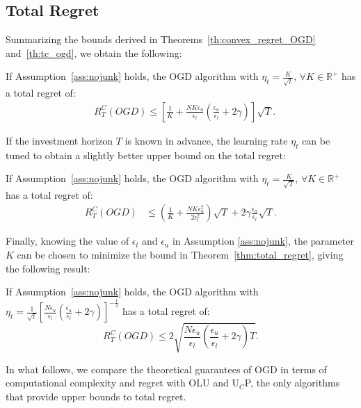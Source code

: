 \subsection{Total Regret}
Summarizing the bounds derived in Theorems~\ref{th:convex_regret_OGD} and~\ref{th:tc_ogd}, we obtain the following:
\begin{theorem} \label{thm:total_regret}
    If Assumption~\ref{ass:nojunk} holds, the OGD algorithm with $\eta_t = \frac{K}{\sqrt{t}}$,  $\forall K \in \mathbb{R}^+$ has a total regret of:
    \begin{align*}
        & R_T^C(OGD) \le \left[ \frac{1}{K} + \frac{NK\epsilon_u}{\epsilon_l}\left( \frac{\epsilon_u}{\epsilon_l} + 2 \gamma \right) \right] \sqrt{T}. %
    \end{align*}
\end{theorem}
If the investment horizon $T$ is known in advance, the learning rate $\eta_t$ can be tuned to obtain a slightly better upper bound on the total regret:
\begin{corollary}\label{cor:OGD_T_known}
   If Assumption~\ref{ass:nojunk} holds, the OGD algorithm with $\eta_t=\frac{K}{\sqrt{T}}$, $\forall K \in \mathbb{R}^+$ has a total regret of:
    \begin{align}
    R_T^C(OGD) &\leq \left( \frac{1}{K} + \frac{NK \epsilon_u^2}{2 \epsilon_l^2} \right) \sqrt{T} + 2 \gamma  \frac{\epsilon_u}{\epsilon_l} \sqrt{T}. \label{eq:OGD_T_known}
    \end{align}
\end{corollary}

Finally, knowing the value of $\epsilon_l$ and $\epsilon_u$ in Assumption \ref{ass:nojunk}, the parameter $K$ can be chosen to minimize the bound in Theorem~\ref{thm:total_regret}, giving the following result:

\begin{corollary} \label{cor:optimal_bound}
    If Assumption~\ref{ass:nojunk} holds, the OGD algorithm with $\eta_t = \frac{1}{\sqrt{t}} \left[ \frac{N \epsilon_u}{\epsilon_l} \left( \frac{\epsilon_u}{\epsilon_l} + 2 \gamma \right) \right]^{-\frac{1}{2}}$ has a total regret of:
    \begin{equation*}
        R_T^C(OGD) \leq 2\sqrt{\frac{N \epsilon_u}{\epsilon_l}\left( \frac{\epsilon_u}{\epsilon_l} + 2 \gamma \right) T}.
    \end{equation*}
\end{corollary}

In what follows, we compare the theoretical guarantees of OGD in terms of computational complexity and regret with OLU and U$_C$P, the only algorithms that provide upper bounds to total regret.

